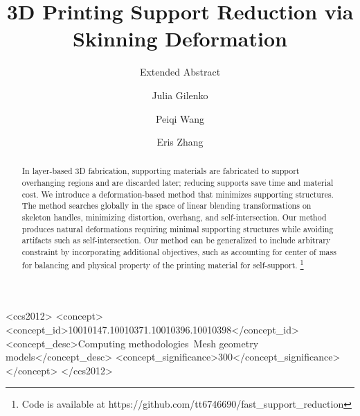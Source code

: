 \documentclass[sigconf]{acmart}
\begin{document}
\title{3D Printing Support Reduction via Skinning Deformation}
\subtitle{Extended Abstract}

\author{Julia Gilenko}
 
\author{Peiqi Wang}

\author{Eris Zhang}

\renewcommand{\shortauthors}{Julia G. Mark W. Eris Z.}
 

\begin{abstract}
 
In layer-based 3D fabrication, supporting materials are fabricated to support overhanging regions and are discarded later; reducing supports save time and material cost. We introduce a deformation-based method that minimizes supporting structures. The method searches globally in the space of linear blending transformations on skeleton handles, minimizing distortion, overhang, and self-intersection. Our method produces natural deformations requiring minimal supporting structures while avoiding artifacts such as self-intersection. Our method can be generalized to include arbitrary constraint by incorporating additional objectives, such as accounting for center of mass for balancing and physical property of the printing material for self-support. \footnote{Code is available at https://github.com/tt6746690/fast\_support\_reduction}
\end{abstract}

%
%
\begin{CCSXML}
    <ccs2012>
    <concept>
    <concept_id>10010147.10010371.10010396.10010398</concept_id>
    <concept_desc>Computing methodologies~Mesh geometry models</concept_desc>
    <concept_significance>300</concept_significance>
    </concept>
    </ccs2012>
\end{CCSXML}



\maketitle





\end{document}
